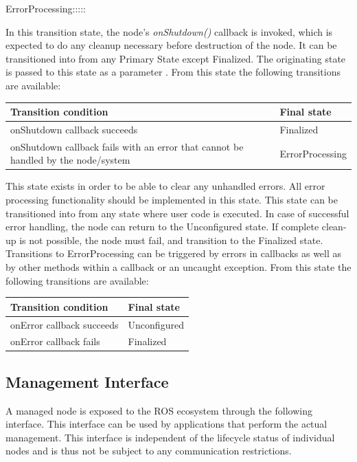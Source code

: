 \begin{labeling}{ErrorProcessing:::::}
		\item[\textbf{ShuttingDown}] In this transition state, the node's \textit{onShutdown()} callback is invoked, which is expected to do any cleanup necessary before destruction of the node. It can be transitioned into from any Primary State except Finalized. The originating state is passed to this state as a parameter .
		From this state the following transitions are available:
		\begin{table}[H]
			\flushright
			\label{tab:Valid transitions}
			\begin{tabular}{|p{8.5cm}|p{3cm}|}
				\toprule
				Transition condition & Final state\\
				\midrule
				onShutdown callback succeeds & Finalized \\
				onShutdown callback fails with an error that cannot be handled by the node/system  & ErrorProcessing \\
				\bottomrule
			\end{tabular}
		\end{table}

		\item[\textbf{ErrorProcessing}] This state exists in order to be able to clear any unhandled errors.  All error processing functionality should be implemented in this state. This state can be transitioned into from any state where user code is executed. In case of successful error handling, the node can return to the Unconfigured state. If complete clean-up is not possible, the node must fail, and transition to the Finalized state. Transitions to ErrorProcessing can be triggered by errors in callbacks as well as by other methods within a callback or an uncaught exception.
		From this state the following transitions are available:
		\begin{table}[H]
			\flushright
			\label{tab:Valid transitions}
			\begin{tabular}{|p{8.5cm}|p{3cm}|}
				\toprule
				Transition condition & Final state\\
				\midrule
				onError callback succeeds & Unconfigured \\
				onError callback fails & Finalized \\
				\bottomrule
			\end{tabular}
		\end{table}

	\end{labeling}

	
	\subsection{Management Interface}
	A managed node is exposed to the ROS ecosystem through the following interface. This interface can be used by applications that perform the actual management. This interface is independent of the lifecycle status of individual nodes and is thus not be subject to any communication restrictions.\\

